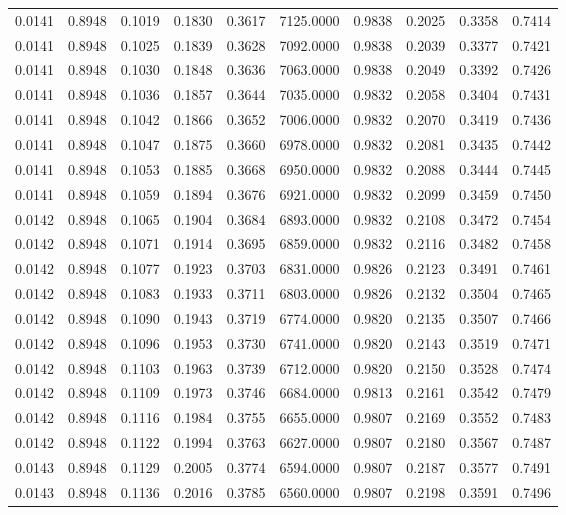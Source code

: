 \begin{tabular}{rrrrrrrrrr}
0.0141 & 0.8948 & 0.1019 & 0.1830 & 0.3617 & 7125.0000 & 0.9838 & 0.2025 & 0.3358 & 0.7414 \\
0.0141 & 0.8948 & 0.1025 & 0.1839 & 0.3628 & 7092.0000 & 0.9838 & 0.2039 & 0.3377 & 0.7421 \\
0.0141 & 0.8948 & 0.1030 & 0.1848 & 0.3636 & 7063.0000 & 0.9838 & 0.2049 & 0.3392 & 0.7426 \\
0.0141 & 0.8948 & 0.1036 & 0.1857 & 0.3644 & 7035.0000 & 0.9832 & 0.2058 & 0.3404 & 0.7431 \\
0.0141 & 0.8948 & 0.1042 & 0.1866 & 0.3652 & 7006.0000 & 0.9832 & 0.2070 & 0.3419 & 0.7436 \\
0.0141 & 0.8948 & 0.1047 & 0.1875 & 0.3660 & 6978.0000 & 0.9832 & 0.2081 & 0.3435 & 0.7442 \\
0.0141 & 0.8948 & 0.1053 & 0.1885 & 0.3668 & 6950.0000 & 0.9832 & 0.2088 & 0.3444 & 0.7445 \\
0.0141 & 0.8948 & 0.1059 & 0.1894 & 0.3676 & 6921.0000 & 0.9832 & 0.2099 & 0.3459 & 0.7450 \\
0.0142 & 0.8948 & 0.1065 & 0.1904 & 0.3684 & 6893.0000 & 0.9832 & 0.2108 & 0.3472 & 0.7454 \\
0.0142 & 0.8948 & 0.1071 & 0.1914 & 0.3695 & 6859.0000 & 0.9832 & 0.2116 & 0.3482 & 0.7458 \\
0.0142 & 0.8948 & 0.1077 & 0.1923 & 0.3703 & 6831.0000 & 0.9826 & 0.2123 & 0.3491 & 0.7461 \\
0.0142 & 0.8948 & 0.1083 & 0.1933 & 0.3711 & 6803.0000 & 0.9826 & 0.2132 & 0.3504 & 0.7465 \\
0.0142 & 0.8948 & 0.1090 & 0.1943 & 0.3719 & 6774.0000 & 0.9820 & 0.2135 & 0.3507 & 0.7466 \\
0.0142 & 0.8948 & 0.1096 & 0.1953 & 0.3730 & 6741.0000 & 0.9820 & 0.2143 & 0.3519 & 0.7471 \\
0.0142 & 0.8948 & 0.1103 & 0.1963 & 0.3739 & 6712.0000 & 0.9820 & 0.2150 & 0.3528 & 0.7474 \\
0.0142 & 0.8948 & 0.1109 & 0.1973 & 0.3746 & 6684.0000 & 0.9813 & 0.2161 & 0.3542 & 0.7479 \\
0.0142 & 0.8948 & 0.1116 & 0.1984 & 0.3755 & 6655.0000 & 0.9807 & 0.2169 & 0.3552 & 0.7483 \\
0.0142 & 0.8948 & 0.1122 & 0.1994 & 0.3763 & 6627.0000 & 0.9807 & 0.2180 & 0.3567 & 0.7487 \\
0.0143 & 0.8948 & 0.1129 & 0.2005 & 0.3774 & 6594.0000 & 0.9807 & 0.2187 & 0.3577 & 0.7491 \\
0.0143 & 0.8948 & 0.1136 & 0.2016 & 0.3785 & 6560.0000 & 0.9807 & 0.2198 & 0.3591 & 0.7496 \\

\end{tabular}
